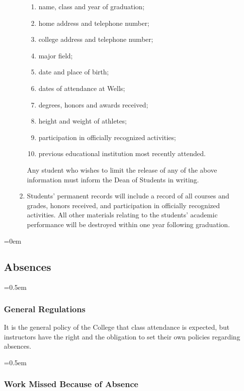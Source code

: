 \documentclass{manual}
\let\oldsubsection\subsection
\renewcommand\subsection{\leftskip=0em\oldsubsection}
\let\oldsubsubsection\subsubsection
\renewcommand\subsubsection{\leftskip=0.5em\oldsubsubsection}
\newcommand{\itemLevelA}{\alph*.}
\newcommand{\itemLevelB}{\arabic*)}
\newcommand{\itemRefA}{\alph*}
\newcommand{\itemRefB}{\arabic*}
\begin{document}
\begin{enumerate}[label=\itemLevelA,ref=\itemRefA]
\begin{enumerate}[label=\itemLevelB,ref=\itemRefB]
						\begin{enumerate}[label=\alph*)]
						\item name, class and year of graduation;
						\item home address and telephone number;
						\item college address and telephone number;
						\item major field;
						\item date and place of birth;
						\item dates of attendance at Wells;
						\item degrees, honors and awards received;
						\item height and weight of athletes;
						\item participation in officially recognized activities;
						\item previous educational institution most recently attended.
						\end{enumerate}

					Any student who wishes to limit the release of any of the above information must inform the Dean of Students in writing.

					\item Students' permanent records will include a record of all courses and grades, honors received, and participation in officially recognized activities. All other materials relating to the students' academic performance will be destroyed within one year following graduation.
					\end{enumerate}
				
				\end{enumerate}

	\subsection{Absences}

		\subsubsection{General Regulations}

			It is the general policy of the College that class attendance is expected, but instructors have the right and the obligation to set their own policies regarding absences.

		\subsubsection{Work Missed Because of Absence}
\end{document}
